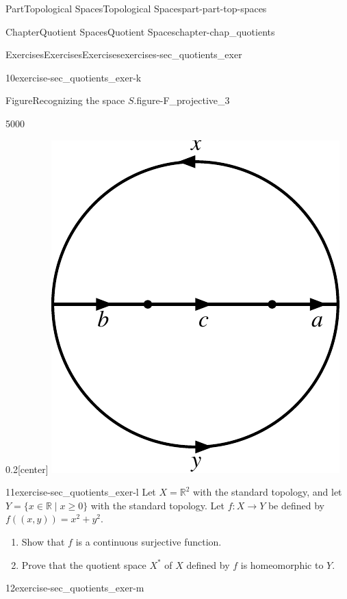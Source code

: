 \documentclass[oneside,10pt,]{book}
\numberwithin{equation}{chapter}
\newcommand{\R}{\mathbb{R}}
\begin{document}
\begin{partptx}{Part}{Topological Spaces}{}{Topological Spaces}{}{}{part-part-top-spaces}
\begin{chapterptx}{Chapter}{Quotient Spaces}{}{Quotient Spaces}{}{}{chapter-chap_quotients}
\begin{exercises-section}{Exercises}{Exercises}{}{Exercises}{}{}{exercises-sec_quotients_exer}
\begin{divisionexercise}{10}{}{}{exercise-sec_quotients_exer-k}
\begin{enumerate}[font=\bfseries,label=(\alph*),ref=\alph*]
\begin{enumerate}[font=\bfseries,label=(\roman*),ref=\theenumi.\roman*]
\begin{figureptx}{Figure}{Recognizing the space \(S\).}{figure-F_projective_3}{}
\begin{sidebyside}{5}{0}{0}{0}
\begin{sbspanel}{0.2}[center]
\includegraphics[width=\linewidth]{external/Projective_Disk_hom_2.pdf}
\end{sbspanel}%
\end{sidebyside}%
\tcblower
\end{figureptx}%
\end{enumerate}%
\end{enumerate}%
\end{divisionexercise}%
\begin{divisionexercise}{11}{}{}{exercise-sec_quotients_exer-l}%
Let \(X = \R^2\) with the standard topology, and let \(Y = \{x \in \R \mid x \geq 0\}\) with the standard topology. Let \(f: X \to Y\) be defined by \(f((x,y)) = x^2+y^2\).%
\begin{enumerate}[font=\bfseries,label=(\alph*),ref=\alph*]%
\item{}Show that \(f\) is a continuous surjective function.%
\item{}Prove that the quotient space \(X^{*}\) of \(X\) defined by \(f\) is homeomorphic to \(Y\).%
\end{enumerate}%
\end{divisionexercise}%
\begin{divisionexercise}{12}{}{}{exercise-sec_quotients_exer-m}%

\end{divisionexercise}
\end{exercises-section}
\end{chapterptx}
\end{partptx}
\end{document}
